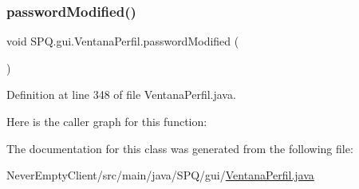 \subsubsection{\texorpdfstring{password\+Modified()}{passwordModified()}}
{\footnotesize\ttfamily void S\+P\+Q.\+gui.\+Ventana\+Perfil.\+password\+Modified (\begin{DoxyParamCaption}{ }\end{DoxyParamCaption})}



Definition at line 348 of file Ventana\+Perfil.\+java.

Here is the caller graph for this function\+:


The documentation for this class was generated from the following file\+:\begin{DoxyCompactItemize}
\item 
Never\+Empty\+Client/src/main/java/\+S\+P\+Q/gui/\mbox{\hyperlink{_ventana_perfil_8java}{Ventana\+Perfil.\+java}}\end{DoxyCompactItemize}
